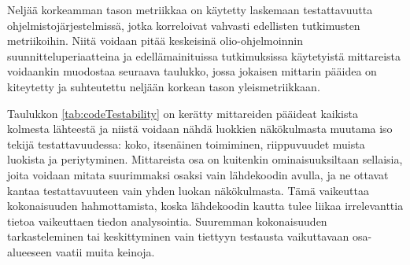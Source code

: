 \documentclass[finnish]{tktltiki2}
\numberwithin{table}{section}
\theoremstyle{definition}
\theoremstyle{remark}
\begin{document}
Neljää korkeamman tason metriikkaa on käytetty laskemaan testattavuutta ohjelmistojärjestelmissä, jotka korreloivat vahvasti edellisten tutkimusten metriikoihin. Niitä voidaan pitää keskeisinä olio-ohjelmoinnin suunnitteluperiaatteina \citep{Khan:2009:MBT:1507195.1507204} ja edellämainituissa tutkimuksissa käytetyistä mittareista voidaankin muodostaa seuraava taulukko, jossa jokaisen mittarin pääidea on kiteytetty ja suhteutettu neljään korkean tason yleismetriikkaan.

\begin{table}[ht]
\centering
	\setlength{\extrarowheight}{4pt}%
\end{table}



\noindent
Taulukkon \ref{tab:codeTestability} on kerätty mittareiden pääideat kaikista kolmesta lähteestä ja niistä voidaan nähdä luokkien näkökulmasta muutama iso tekijä testattavuudessa: koko, itsenäinen toimiminen, riippuvuudet muista luokista ja periytyminen. Mittareista osa on kuitenkin ominaisuuksiltaan sellaisia, joita voidaan mitata suurimmaksi osaksi vain lähdekoodin avulla, ja ne ottavat kantaa testattavuuteen vain yhden luokan näkökulmasta. Tämä vaikeuttaa kokonaisuuden hahmottamista, koska lähdekoodin kautta tulee liikaa irrelevanttia tietoa vaikeuttaen tiedon analysointia. Suuremman kokonaisuuden tarkasteleminen tai keskittyminen vain tiettyyn testausta vaikuttavaan osa-alueeseen vaatii muita keinoja.
\end{document}
